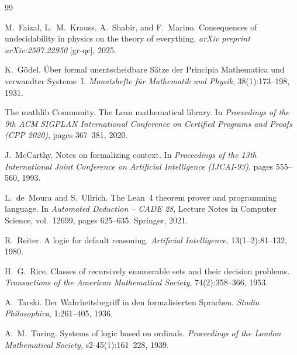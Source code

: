\documentclass[11pt]{article}
\theoremstyle{plain}
\theoremstyle{definition}
\theoremstyle{remark}
\begin{document}
\begin{thebibliography}{99}

M.~Faizal, L.~M.~Krauss, A.~Shabir, and F.~Marino.
Consequences of undecidability in physics on the theory of everything.
\emph{arXiv preprint arXiv:2507.22950} [gr-qc], 2025.

K.~G\"odel.
\"Uber formal unentscheidbare S\"atze der Principia Mathematica und verwandter
Systeme~I.
\emph{Monatshefte f\"ur Mathematik und Physik}, 38(1):173--198, 1931.

The mathlib Community.
The Lean mathematical library.
In \emph{Proceedings of the 9th ACM SIGPLAN International Conference on
Certified Programs and Proofs (CPP 2020)}, pages 367--381, 2020.

J.~McCarthy.
Notes on formalizing context.
In \emph{Proceedings of the 13th International Joint Conference on Artificial
Intelligence (IJCAI-93)}, pages 555--560, 1993.

L.~de~Moura and S.~Ullrich.
The Lean~4 theorem prover and programming language.
In \emph{Automated Deduction -- CADE 28}, Lecture Notes in Computer Science,
vol.~12699, pages 625--635. Springer, 2021.

R.~Reiter.
A logic for default reasoning.
\emph{Artificial Intelligence}, 13(1--2):81--132, 1980.

H.~G.~Rice.
Classes of recursively enumerable sets and their decision problems.
\emph{Transactions of the American Mathematical Society}, 74(2):358--366, 1953.

A.~Tarski.
Der Wahrheitsbegriff in den formalisierten Sprachen.
\emph{Studia Philosophica}, 1:261--405, 1936.

A.~M.~Turing.
Systems of logic based on ordinals.
\emph{Proceedings of the London Mathematical Society}, s2-45(1):161--228, 1939.

\end{thebibliography}
\end{document}
